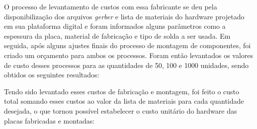 O processo de levantamento de custos com essa fabricante se deu pela disponibilização dos arquivos \textit{gerber} e lista de materiais do hardware projetado em sua plataforma digital e foram informados alguns parâmetros como a espessura da placa, material de fabricação e tipo de solda a ser usada. Em seguida, após alguns ajustes finais do processo de montagem de componentes, foi criado um orçamento para ambos os processos. Foram então levantados os valores de custo desses processos para as quantidades de 50, 100 e 1000 unidades, sendo obtidos os seguintes resultados:

	\begin{table}[!h]
	\captionsetup{width=7cm}%
    \end{table}
Tendo sido levantado esses custos de fabricação e montagem, foi feito o custo total somando esses custos ao valor da lista de materiais para cada quantidade desejada, o que tornou possível estabelecer o custo unitário do hardware das placas fabricadas e montadas:


	\begin{table}[!h]
	\captionsetup{width=7cm}%
    \end{table}


